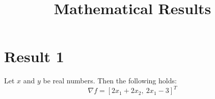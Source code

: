 \documentclass{article}
\title{Mathematical Results}
\author{}
\date{}
\begin{document}
\maketitle

\section*{Result 1}
Let \( x \) and \( y \) be real numbers. Then the following holds:
\begin{equation}
    \nabla f = \left[ 2 x_{1} + 2 x_{2}, \  2 x_{1} - 3\right]^{T}
\end{equation}
\end{document}
